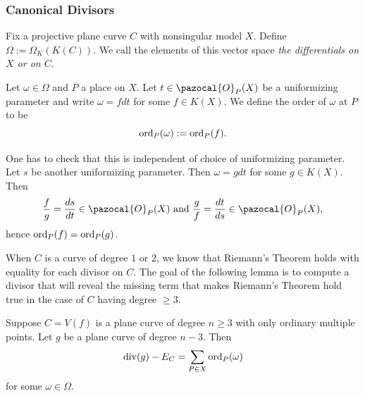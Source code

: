     \subsubsection{Canonical Divisors}
    Fix a projective plane curve $C$ with nonsingular model $X$. Define $\Omega := \Omega_K(K(C))$. We call the elements of this vector space \emph{the differentials on $X$ or on $C$}. 
    \begin{definition}
        Let $\omega \in \Omega$ and $P$ a place on $X$. Let $t\in \pazocal{O}_P(X)$ be a uniformizing parameter and write $\omega = fdt$ for some $f\in K(X)$. We define the order of $\omega$ at $P$ to be 
        $$
            \mathrm{ord}_P(\omega) : = \mathrm{ord}_P(f).
        $$
    \end{definition} 
    \begin{remark}
        One has to check that this is independent of choice of uniformizing parameter. Let $s$ be another uniformizing parameter. Then $\omega = g dt$ for some $g\in K(X)$. Then 
            $$ 
                \frac{f}{g} = \frac{ds}{dt}\in \pazocal{O}_P(X) \text{ and } \frac{g}{f} =  \frac{dt}{ds}\in \pazocal{O}_P(X),
            $$
        hence $\mathrm{ord}_P(f)=\mathrm{ord}_P(g)$.
    \end{remark}
    When $C$ is a curve of degree $1$ or $2$, we know that Riemann's Theorem holds with equality for each divisor on $C$. The goal of the following lemma is to compute a divisor that will reveal the missing term that makes Riemann's Theorem hold true in the case of $C$ having degree $\geq 3$.  
     \begin{lemma}
        Suppose $C=V(f)$ is a plane curve of degree $n\geq 3$ with only ordinary multiple points. Let $g$ be a plane curve of degree $n-3$. Then 
        $$
            \mathrm{div}(g)-E_C = \sum_{P\in X} \mathrm{ord}_P(\omega)
        $$
        for some $\omega\in \Omega$.
    \end{lemma}
